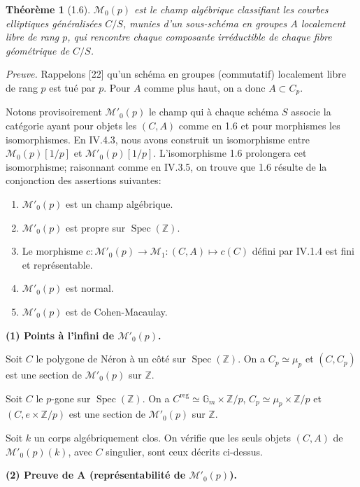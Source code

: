 \documentclass[11pt,a4paper]{amsart}
\theoremstyle{plain}
\newtheorem{theorem}{Th\'eor\`eme}[section]
\theoremstyle{definition}
\DeclareMathOperator{\Spec}{Spec}
\DeclareMathOperator{\reg}{reg}
\newcommand{\mll}{\mathcal{M}}
\newcommand{\Gm}{\mathbb{G}_m}
\newcommand{\ZZ}{\mathbb{Z}}
\begin{document}
\begin{theorem}[1.6]
$\mll_0(p)$ est le champ alg\'ebrique classifiant les courbes elliptiques g\'en\'eralis\'ees $C/S$, munies d'un sous-sch\'ema en groupes $A$ localement libre de rang $p$, qui rencontre chaque composante irr\'eductible de chaque fibre g\'eom\'etrique de $C/S$.
\end{theorem}

\noindent\textit{Preuve.} Rappelons [22] qu'un sch\'ema en groupes (commutatif) localement libre de rang $p$ est tu\'e par $p$. Pour $A$ comme plus haut, on a donc $A \subset C_p$.

Notons provisoirement $\mll'_0(p)$ le champ qui \`a chaque sch\'ema $S$ associe la cat\'egorie ayant pour objets les $(C,A)$ comme en 1.6 et pour morphismes les isomorphismes. En IV.4.3, nous avons construit un isomorphisme entre $\mll_0(p)[1/p]$ et $\mll'_0(p)[1/p]$. L'isomorphisme 1.6 prolongera cet isomorphisme; raisonnant comme en IV.3.5, on trouve que 1.6 r\'esulte de la conjonction des assertions suivantes:

\begin{enumerate}[label=\Alph*)]
\item $\mll'_0(p)$ est un champ alg\'ebrique.
\item $\mll'_0(p)$ est propre sur $\Spec(\ZZ)$.
\item Le morphisme $c \colon \mll'_0(p) \to \mll_1 \colon (C,A) \mapsto c(C)$ d\'efini par IV.1.4 est fini et repr\'esentable.
\item $\mll'_0(p)$ est normal.
\item $\mll'_0(p)$ est de Cohen-Macaulay.
\end{enumerate}

\medskip

\noindent\textbf{(1) Points \`a l'infini de $\mll'_0(p)$.}

Soit $C$ le polygone de N\'eron \`a un c\^ot\'e sur $\Spec(\ZZ)$. On a $C_p \simeq \mu_p$ et $(C, C_p)$ est une section de $\mll'_0(p)$ sur $\ZZ$.

Soit $C$ le $p$-gone sur $\Spec(\ZZ)$. On a $C^{\reg} \simeq \Gm \times \ZZ/p$, $C_p \simeq \mu_p \times \ZZ/p$ et $(C, e \times \ZZ/p)$ est une section de $\mll'_0(p)$ sur $\ZZ$.

Soit $k$ un corps alg\'ebriquement clos. On v\'erifie que les seuls objets $(C,A)$ de $\mll'_0(p)(k)$, avec $C$ singulier, sont ceux d\'ecrits ci-dessus.

\medskip

\noindent\textbf{(2) Preuve de A (repr\'esentabilit\'e de $\mll'_0(p)$).}
\end{document}
